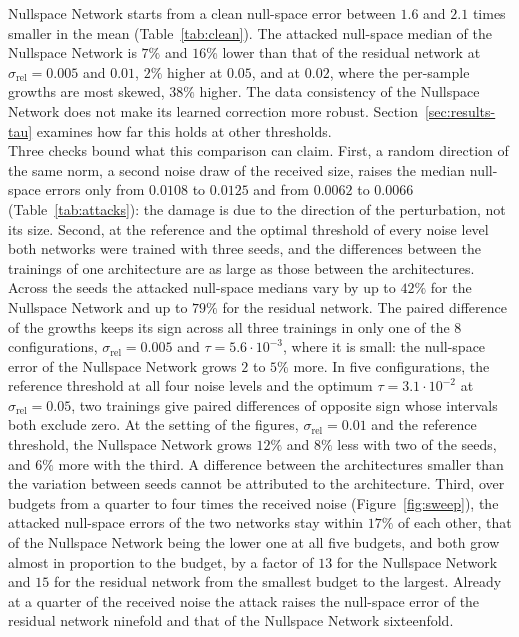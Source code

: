 \documentclass{article}
\numberwithin{equation}{section}
\begin{document}
Nullspace Network starts from a clean null-space error between $1.6$ and $2.1$ times smaller in the
mean (Table~\ref{tab:clean}). The attacked null-space median of the Nullspace Network is $7\%$ and $16\%$
lower than that of the residual network at $\sigma_\text{rel}=0.005$ and $0.01$, $2\%$ higher at
$0.05$, and at $0.02$, where the per-sample growths are most skewed, $38\%$ higher. The data consistency of
the Nullspace Network does not make its learned correction more robust. Section~\ref{sec:results-tau}
examines how far this holds at other thresholds.\\
Three checks bound what this comparison can claim. First, a random direction of the same norm, a second
noise draw of the received size, raises the median null-space errors only from $0.0108$ to $0.0125$ and from
$0.0062$ to $0.0066$ (Table~\ref{tab:attacks}): the damage is due to the direction of the perturbation, not
its size. Second, at the reference and the optimal threshold of every noise level both networks were trained
with three seeds, and the differences between the trainings of one architecture are as large as those
between the architectures. Across the seeds the attacked null-space medians vary by up to $42\%$ for the
Nullspace Network and up to $79\%$ for the residual network. The paired difference of the growths keeps
its sign across all three trainings in only one of the $8$ configurations, $\sigma_\text{rel}=0.005$ and
$\tau=5.6\cdot10^{-3}$, where it is small: the null-space error of the Nullspace Network grows $2$ to $5\%$
more. In five configurations, the reference threshold at all four noise levels and the optimum
$\tau=3.1\cdot10^{-2}$ at $\sigma_\text{rel}=0.05$, two trainings give paired differences of opposite
sign whose intervals both exclude zero.
At the setting of the figures,
$\sigma_\text{rel}=0.01$ and the reference threshold, the Nullspace Network grows $12\%$ and $8\%$ less
with two of the seeds, and $6\%$ more with the third. A difference between the
architectures smaller than the variation between seeds cannot be attributed to the architecture.
Third, over budgets from a quarter to four times the received noise
(Figure~\ref{fig:sweep}), the attacked null-space errors of the two networks stay within $17\%$ of each
other, that of the Nullspace Network being the lower one at all five budgets, and both grow almost in
proportion to the budget, by a factor of $13$ for the Nullspace Network and $15$ for the residual network
from the smallest budget to the largest. Already at a quarter of the received noise the attack raises the
null-space error of the residual network ninefold and that of the Nullspace Network sixteenfold.\\
\end{document}
